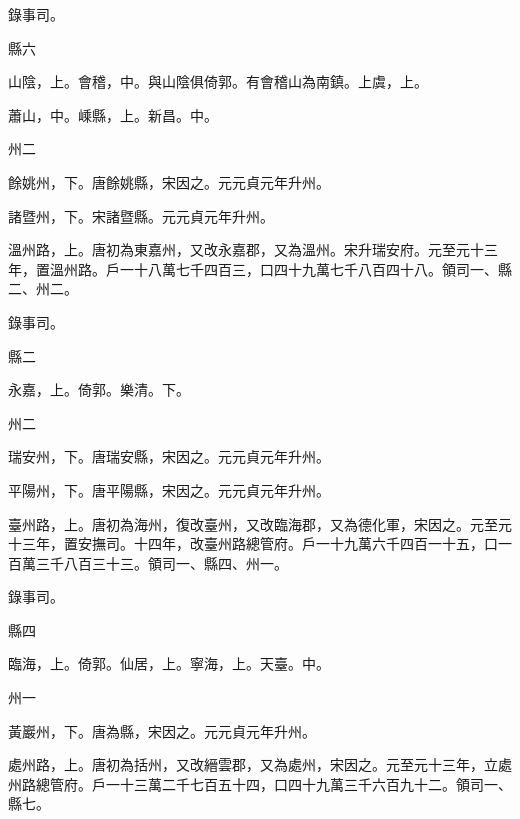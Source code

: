 \begin{pinyinscope}
 錄事司。



 縣六



 山陰，上。會稽，中。與山陰俱倚郭。有會稽山為南鎮。上虞，上。



 蕭山，中。嵊縣，上。新昌。中。



 州二



 餘姚州，下。唐餘姚縣，宋因之。元元貞元年升州。



 諸暨州，下。宋諸暨縣。元元貞元年升州。



 溫州路，上。唐初為東嘉州，又改永嘉郡，又為溫州。宋升瑞安府。元至元十三年，置溫州路。戶一十八萬七千四百三，口四十九萬七千八百四十八。領司一、縣二、州二。



 錄事司。



 縣二



 永嘉，上。倚郭。樂清。下。



 州二



 瑞安州，下。唐瑞安縣，宋因之。元元貞元年升州。



 平陽州，下。唐平陽縣，宋因之。元元貞元年升州。



 臺州路，上。唐初為海州，復改臺州，又改臨海郡，又為德化軍，宋因之。元至元十三年，置安撫司。十四年，改臺州路總管府。戶一十九萬六千四百一十五，口一百萬三千八百三十三。領司一、縣四、州一。



 錄事司。



 縣四



 臨海，上。倚郭。仙居，上。寧海，上。天臺。中。



 州一



 黃巖州，下。唐為縣，宋因之。元元貞元年升州。



 處州路，上。唐初為括州，又改縉雲郡，又為處州，宋因之。元至元十三年，立處州路總管府。戶一十三萬二千七百五十四，口四十九萬三千六百九十二。領司一、縣七。




\end{pinyinscope}
